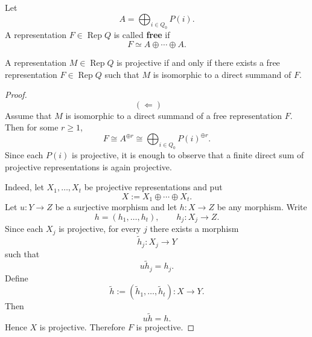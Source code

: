 \documentclass[11pt, a4paper]{report}
\begin{document}
        \begin{definition}
            Let
        \[
        A=\bigoplus_{i\in Q_0} P(i).
        \]
        A representation $F\in \operatorname{Rep}Q$ is called \textbf{free} if
        \[
        F\simeq A\oplus \cdots \oplus A.
        \]
        \end{definition}

        \begin{proposition}
            A representation $M\in \operatorname{Rep}Q$ is projective if and only if there exists a free representation $F\in \operatorname{Rep}Q$ such that $M$ is isomorphic to a direct summand of $F$.
        \end{proposition}

        \begin{proof}
            \[
                (\Longleftarrow)\qquad
            \]
            Assume that $M$ is isomorphic to a direct summand of a free representation $F$.
            Then for some $r\ge 1$,
            \[
                F \cong A^{\oplus r}
                \cong \bigoplus_{i\in Q_0} P(i)^{\oplus r}.
            \]
            Since each $P(i)$ is projective, it is enough to observe that a finite direct sum
            of projective representations is again projective.

            Indeed, let $X_1,\dots,X_t$ be projective representations and put
            \[
                X:=X_1\oplus\cdots\oplus X_t.
            \]
            Let $u\colon Y\to Z$ be a surjective morphism and let $h\colon X\to Z$ be any morphism.
            Write
            \[
                h=(h_1,\dots,h_t),
                \qquad h_j\colon X_j\to Z.
            \]
            Since each $X_j$ is projective, for every $j$ there exists a morphism
            \[
                \widetilde{h}_j\colon X_j\to Y
            \]
            such that
            \[
                u\widetilde{h}_j=h_j.
            \]
            Define
            \[
                \widetilde{h}:=(\widetilde{h}_1,\dots,\widetilde{h}_t)\colon X\to Y.
            \]
            Then
            \[
                u\widetilde{h}=h.
            \]
            Hence $X$ is projective. Therefore $F$ is projective.


\end{proof}
\end{document}
